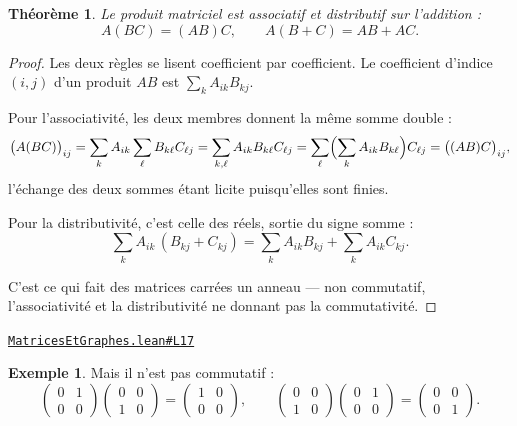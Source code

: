 \documentclass[11pt,a4paper]{article}
\theoremstyle{definition}
\newtheorem{exemple}{Exemple}
\theoremstyle{plain}
\newtheorem{theoreme}{Théorème}
\newcommand{\source}[2]{\par\smallskip\noindent\hfill{\footnotesize\href{#1}{\texttt{#2}}}\par\smallskip}
\begin{document}
\begin{theoreme}
Le produit matriciel est associatif et distributif sur l'addition :
\[ A(BC) = (AB)C , \qquad A(B + C) = AB + AC . \]
\end{theoreme}

\begin{proof}
Les deux règles se lisent coefficient par coefficient. Le coefficient d'indice $(i, j)$ d'un
produit $AB$ est $\sum_k A_{ik} B_{kj}$.

Pour l'associativité, les deux membres donnent la même somme double :
\[ \bigl(A(BC)\bigr)_{ij} = \sum_k A_{ik} \sum_\ell B_{k\ell} C_{\ell j}
   = \sum_{k, \ell} A_{ik} B_{k\ell} C_{\ell j}
   = \sum_\ell \Bigl(\sum_k A_{ik} B_{k\ell}\Bigr) C_{\ell j} = \bigl((AB)C\bigr)_{ij} , \]
l'échange des deux sommes étant licite puisqu'elles sont finies.

Pour la distributivité, c'est celle des réels, sortie du signe somme :
\[ \sum_k A_{ik}\,(B_{kj} + C_{kj}) = \sum_k A_{ik} B_{kj} + \sum_k A_{ik} C_{kj} . \]

C'est ce qui fait des matrices carrées un anneau — non commutatif, l'associativité et la
distributivité ne donnant pas la commutativité.
\end{proof}
\source{https://github.com/Commutator-IO/learn-lean/blob/main/courses/02-lycee/10-specialite-mathematiques-terminale-s/MatricesEtGraphes.lean\#L17}{MatricesEtGraphes.lean\#L17}

\begin{exemple}
Mais il n'est pas commutatif :
\[ \begin{pmatrix} 0 & 1 \\ 0 & 0 \end{pmatrix}
   \begin{pmatrix} 0 & 0 \\ 1 & 0 \end{pmatrix}
   = \begin{pmatrix} 1 & 0 \\ 0 & 0 \end{pmatrix} ,
   \qquad
   \begin{pmatrix} 0 & 0 \\ 1 & 0 \end{pmatrix}
   \begin{pmatrix} 0 & 1 \\ 0 & 0 \end{pmatrix}
   = \begin{pmatrix} 0 & 0 \\ 0 & 1 \end{pmatrix} . \]
\end{exemple}
\end{document}

